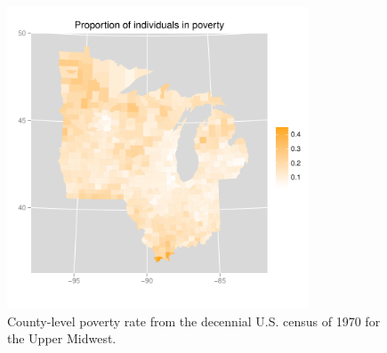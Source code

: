 \documentclass[authoryear, review, 11pt]{elsarticle}
\begin{document}
	\begin{figure}
		\begin{center}
			\includegraphics[width=0.8\textwidth]{../../figures/practice-talk/poverty-response}
			\caption{County-level poverty rate from the decennial U.S. census of 1970 for the Upper Midwest. \label{fig:1970-response}}
		\end{center}
	\end{figure}
\end{document}
